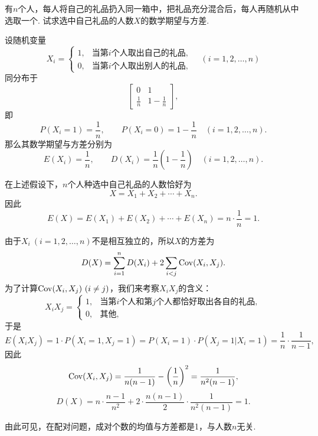 \begin{example}[配对问题]
有\(n\)个人，每人将自己的礼品扔入同一箱中，把礼品充分混合后，每人再随机从中选取一个.
试求选中自己礼品的人数\(X\)的数学期望与方差.
\begin{solution}
设随机变量\[
    X_i = \left\{ \begin{array}{ll}
    1, & \text{当第\(i\)个人取出自己的礼品}, \\
    0, & \text{当第\(i\)个人取出别人的礼品},
    \end{array} \right.
    \quad(i=1,2,\dotsc,n)
\]同分布于\[
    \begin{bmatrix}
    0 & 1 \\
    \frac{1}{n} & 1-\frac{1}{n}
    \end{bmatrix},
\]
即\[
    P(X_i=1) = \frac{1}{n}, \qquad
    P(X_i=0) = 1-\frac{1}{n}
    \quad(i=1,2,\dotsc,n).
\]
那么其数学期望与方差分别为\[
    E(X_i) = \frac{1}{n},
    \qquad
    D(X_i) = \frac{1}{n}\left(1-\frac{1}{n}\right)
    \quad(i=1,2,\dotsc,n).
\]

在上述假设下，\(n\)个人种选中自己礼品的人数恰好为\[
    X = X_1+X_2+\dotsb+X_n.
\]因此\[
    E(X) = E(X_1)+E(X_2)+\dotsb+E(X_n)
    = n \cdot \frac{1}{n}
    = 1.
\]

由于\(X_i\ (i=1,2,\dotsc,n)\)不是相互独立的，所以\(X\)的方差为\[
    D(X) = \sum\limits_{i=1}^n D(X_i) + 2 \sum\limits_{i<j} \operatorname{Cov}(X_i,X_j).
\]
为了计算\(\operatorname{Cov}(X_i,X_j)\ (i \neq j)\)，我们来考察\(X_i X_j\)的含义：\[
    X_i X_j = \left\{ \begin{array}{ll}
    1, & \text{当第\(i\)个人和第\(j\)个人都恰好取出各自的礼品}, \\
    0, & \text{其他},
    \end{array} \right.
\]于是\[
    E(X_i X_j) = 1 \cdot P(X_i=1,X_j=1)
    = P(X_i=1) \cdot P(X_j=1 \vert X_i=1)
    = \frac{1}{n} \cdot \frac{1}{n-1},
\]
因此\[
    \operatorname{Cov}(X_i,X_j) = \frac{1}{n(n-1)} - \left(\frac{1}{n}\right)^2
    = \frac{1}{n^2(n-1)},
\]\[
    D(X) = n \cdot \frac{n-1}{n^2} + 2 \cdot \frac{n(n-1)}{2} \cdot \frac{1}{n^2(n-1)}
    = 1.
\]
\end{solution}
由此可见，在配对问题，成对个数的均值与方差都是1，与人数\(n\)无关.
\end{example}

